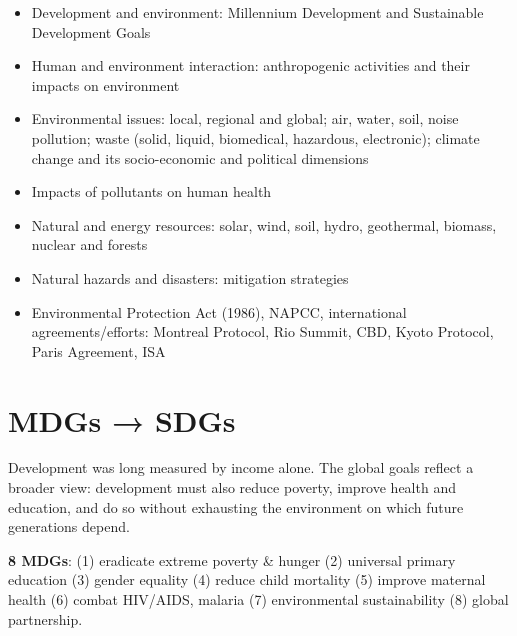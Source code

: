

\begin{sylbox}

\begin{itemize}
\tightlist
\item[$\square$]
  Development and environment: Millennium Development and Sustainable Development Goals
\item[$\square$]
  Human and environment interaction: anthropogenic activities and their impacts on environment
\item[$\square$]
  Environmental issues: local, regional and global; air, water, soil, noise pollution; waste (solid, liquid, biomedical, hazardous, electronic); climate change and its socio-economic and political dimensions
\item[$\square$]
  Impacts of pollutants on human health
\item[$\square$]
  Natural and energy resources: solar, wind, soil, hydro, geothermal, biomass, nuclear and forests
\item[$\square$]
  Natural hazards and disasters: mitigation strategies
\item[$\square$]
  Environmental Protection Act (1986), NAPCC, international agreements/efforts: Montreal Protocol, Rio Summit, CBD, Kyoto Protocol, Paris Agreement, ISA
\end{itemize}

\end{sylbox}

\needspace{125pt}

\hypertarget{p1-09--1-mdgs--sdgs}{%
\section{MDGs → SDGs}\label{p1-09--1-mdgs--sdgs}}

Development was long measured by income alone. The global goals reflect a broader view: development must
also reduce poverty, improve health and education, and do so without exhausting the environment on which
future generations depend.



\textbf{8 MDGs}: (1) eradicate extreme poverty \& hunger (2) universal primary education (3) gender equality
(4) reduce child mortality (5) improve maternal health (6) combat HIV/AIDS, malaria (7) environmental sustainability (8) global partnership.

